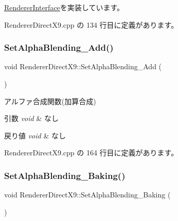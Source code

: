 \mbox{\hyperlink{class_renderer_interface_aa9e12d2a2f5ffa351c457cfc7806b6f1}{Renderer\+Interface}}を実装しています。



 Renderer\+Direct\+X9.\+cpp の 134 行目に定義があります。

\mbox{\label{class_renderer_direct_x9_aa552107a3d5f8a61347fe10741fd04a3}} 
\subsubsection{\texorpdfstring{Set\+Alpha\+Blending\+\_\+\+Add()}{SetAlphaBlending\_Add()}}
{\footnotesize\ttfamily void Renderer\+Direct\+X9\+::\+Set\+Alpha\+Blending\+\_\+\+Add (\begin{DoxyParamCaption}{ }\end{DoxyParamCaption})}



アルファ合成関数(加算合成) 


\begin{DoxyParams}{引数}
{\em void} & なし \\
\hline
\end{DoxyParams}

\begin{DoxyRetVals}{戻り値}
{\em void} & なし \\
\hline
\end{DoxyRetVals}


 Renderer\+Direct\+X9.\+cpp の 164 行目に定義があります。

\mbox{\label{class_renderer_direct_x9_a083f55d941075227189769fd9807ffd1}} 
\subsubsection{\texorpdfstring{Set\+Alpha\+Blending\+\_\+\+Baking()}{SetAlphaBlending\_Baking()}}
{\footnotesize\ttfamily void Renderer\+Direct\+X9\+::\+Set\+Alpha\+Blending\+\_\+\+Baking (\begin{DoxyParamCaption}{ }\end{DoxyParamCaption})}



